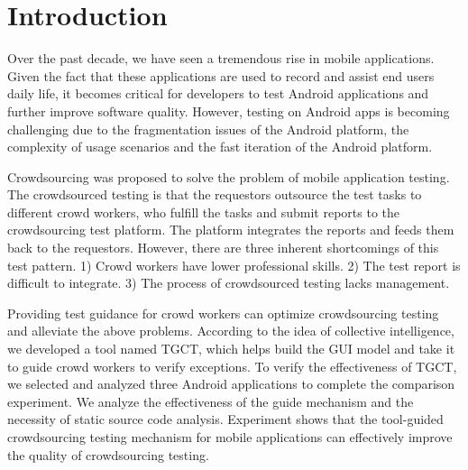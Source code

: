 \section{Introduction}
Over the past decade, we have seen a tremendous rise in mobile applications. Given the fact that these applications are used to record and assist end users daily life, it becomes critical for developers to test Android applications and further improve software quality. However, testing on Android apps is becoming challenging due to the fragmentation issues of the Android platform\cite{park2013fragmentation}, the complexity of usage scenarios and the fast iteration of the Android platform.

Crowdsourcing was proposed to solve the problem of mobile application testing. The crowdsourced testing is that the requestors outsource the test tasks to different crowd workers, who fulfill the tasks and submit reports to the crowdsourcing test platform. The platform integrates the reports and feeds them back to the requestors\cite{feng2015test}. However, there are three inherent shortcomings of this test pattern. 1) Crowd workers have lower professional skills. 2) The test report is difficult to integrate. 3) The process of crowdsourced testing lacks management. 

Providing test guidance for crowd workers can optimize crowdsourcing testing and alleviate the above problems. According to the idea of collective intelligence, we developed a tool named TGCT, which helps build the GUI model and take it to guide crowd workers to verify exceptions. To verify the effectiveness of TGCT, we selected and analyzed three Android applications to complete the comparison experiment. We analyze the effectiveness of the guide mechanism and the necessity of static source code analysis. Experiment shows that the tool-guided crowdsourcing testing mechanism for mobile applications can effectively improve the quality of crowdsourcing testing.



